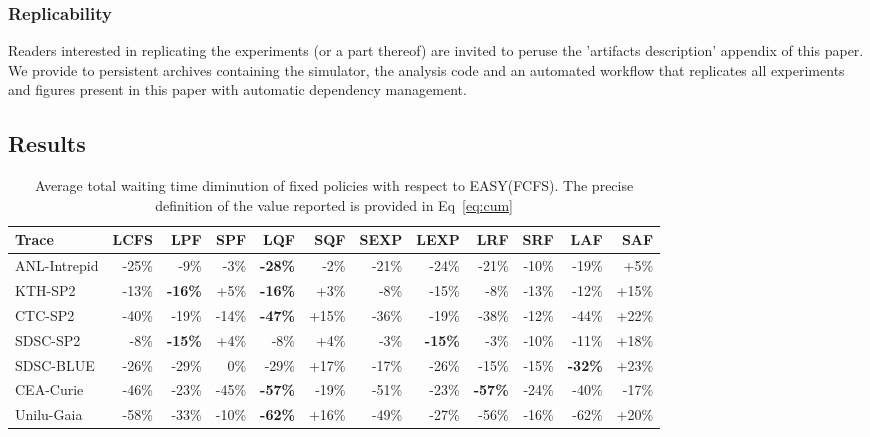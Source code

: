 \documentclass[sigconf,anonymous]{acmart}
\newcommand{\ra}[1]{\renewcommand{\arraystretch}{#1}}
\begin{document}
\subsubsection{Replicability}

Readers interested in replicating the experiments (or a part thereof) are
invited to peruse the 'artifacts description' appendix of this paper. We
provide to persistent archives containing the simulator, the analysis code and
an automated workflow that replicates all experiments and figures present in
this paper with automatic dependency management.

\subsection{Results}
\label{sub:results}

\begin{table}[]
  \centering
  \ra{1.3}

  \caption{Average total waiting time diminution of fixed policies with respect
  to EASY(FCFS). The precise definition of the value reported is provided in
Eq~\ref{eq:cum}}


  \label{tab:full}
  \begin{tabular}{@{}lrrrrrrrrrrr@{}}
    \hline
    Trace        & LCFS  & LPF            & SPF   & LQF            & SQF   & SEXP  & LEXP           & LRF            & SRF   & LAF          & SAF   \\
    \hline
    ANL-Intrepid & -25\% & -9\%           & -3\%  & \textbf{-28\%} & -2\%  & -21\% & -24\%          & -21\%          & -10\% & -19\%        & +5\%  \\
    KTH-SP2      & -13\% & \textbf{-16\%} & +5\%  & \textbf{-16\%} & +3\%  & -8\%  & -15\%          & -8\%           & -13\% & -12\%        & +15\% \\
    CTC-SP2      & -40\% & -19\%          & -14\% & \textbf{-47\%} & +15\% & -36\% & -19\%          & -38\%          & -12\% & -44\%        & +22\% \\
    SDSC-SP2     & -8\%  & \textbf{-15\%} & +4\%  & -8\%           & +4\%  & -3\%  & \textbf{-15\%} & -3\%           & -10\% & -11\%        & +18\% \\
    SDSC-BLUE    & -26\% & -29\%          & 0\%   & -29\%          & +17\% & -17\% & -26\%          & -15\%          & -15\% & \textbf{-32\%} & +23\% \\
    CEA-Curie    & -46\% & -23\%          & -45\% & \textbf{-57\%} & -19\% & -51\% & -23\%          & \textbf{-57\%} & -24\% & -40\%        & -17\% \\
    Unilu-Gaia   & -58\% & -33\%          & -10\% & \textbf{-62\%} & +16\% & -49\% & -27\%          & -56\%          & -16\% & -62\%        & +20\% \\
    \hline
  \end{tabular}
\end{table}
\end{document}
